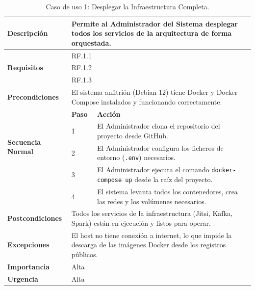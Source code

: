 \begin{table}[H]
    \centering
    \caption{Caso de uso 1: Desplegar la Infraestructura Completa.}
    \label{tab:uc1}
    \begin{tabular}{|p{3cm}|p{0.75cm}|p{8.5cm}|}
        \hline
        \textbf{Descripción} & \multicolumn{2}{p{9.25cm}|}{Permite al Administrador del Sistema desplegar todos los servicios de la arquitectura de forma orquestada.} \\
        \hline
        \multirow{3}{3cm}{\textbf{Requisitos}} & \multicolumn{2}{p{9.25cm}|}{RF.1.1} \\ \cline{2-3}
         & \multicolumn{2}{p{9.25cm}|}{RF.1.2} \\ \cline{2-3}
         & \multicolumn{2}{p{9.25cm}|}{RF.1.3} \\
        \hline
        \textbf{Precondiciones} & \multicolumn{2}{p{9.25cm}|}{El sistema anfitrión (Debian 12) tiene Docker y Docker Compose instalados y funcionando correctamente.} \\
        \hline
        \multirow{4}{3cm}{\textbf{Secuencia Normal}} & \textbf{Paso} & \textbf{Acción} \\ \cline{2-3}
         & 1 & El Administrador clona el repositorio del proyecto desde GitHub. \\ \cline{2-3}
         & 2 & El Administrador configura los ficheros de entorno (\texttt{.env}) necesarios. \\ \cline{2-3}
         & 3 & El Administrador ejecuta el comando \texttt{docker-compose up} desde la raíz del proyecto. \\ \cline{2-3}
         & 4 & El sistema levanta todos los contenedores, crea las redes y los volúmenes necesarios. \\
        \hline
        \textbf{Postcondiciones} & \multicolumn{2}{p{9.25cm}|}{Todos los servicios de la infraestructura (Jitsi, Kafka, Spark) están en ejecución y listos para operar.} \\
        \hline
        \textbf{Excepciones} & \multicolumn{2}{p{9.25cm}|}{El host no tiene conexión a internet, lo que impide la descarga de las imágenes Docker desde los registros públicos.} \\
        \hline
        \textbf{Importancia} & \multicolumn{2}{p{9.25cm}|}{Alta} \\
        \hline
        \textbf{Urgencia} & \multicolumn{2}{p{9.25cm}|}{Alta} \\
        \hline
    \end{tabular}
\end{table}

